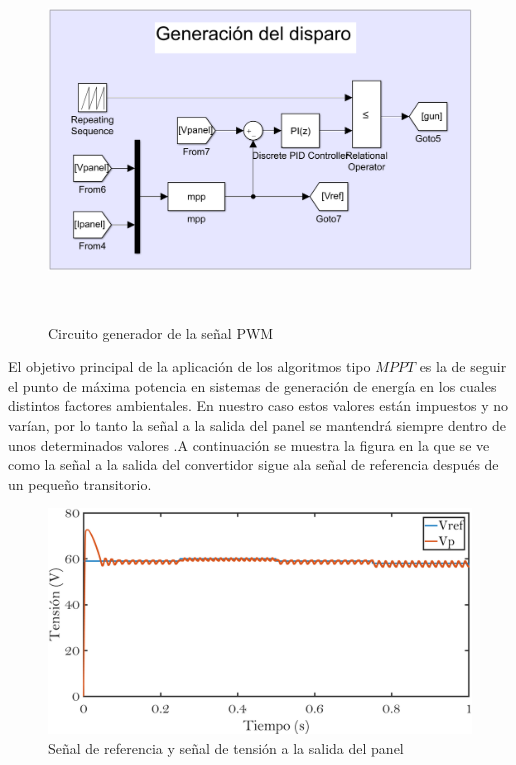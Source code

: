 \documentclass[	DIV=calc,%
							paper=letter,%
							fontsize=12pt%
                            ]{scrartcl}	 					%
\begin{document}
\hfill
\

\begin{figure}[h]
\centering
\includegraphics[scale=0.5]{confly}

\hfill
\

\caption{Circuito generador de la señal PWM}
\end{figure}

El objetivo principal de la aplicación de los algoritmos tipo $MPPT$ es la de seguir el punto de máxima potencia en sistemas de generación de energía en los cuales distintos factores ambientales. En nuestro caso estos valores están impuestos y no varían, por lo tanto la señal a la salida del panel se mantendrá siempre dentro de unos determinados valores .A continuación se muestra la figura en la que se ve como la señal a la salida del convertidor sigue  ala señal de referencia  después de un pequeño transitorio.

\newpage

\begin{figure}[h]
\centering
\includegraphics[scale=0.4]{img_1}
\caption{Señal de referencia y señal de tensión a la salida del panel}
\end{figure}
\end{document}
